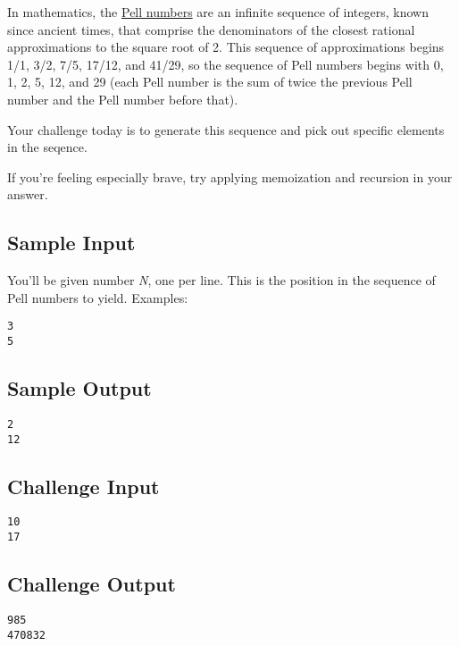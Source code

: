 In mathematics, the
\href{https://en.wikipedia.org/wiki/Pell_number}{Pell numbers} are an
infinite sequence of integers, known since ancient times, that comprise
the denominators of the closest rational approximations to the square
root of 2. This sequence of approximations begins 1/1, 3/2, 7/5, 17/12,
and 41/29, so the sequence of Pell numbers begins with 0, 1, 2, 5, 12,
and 29 (each Pell number is the sum of twice the previous Pell number
and the Pell number before that).

Your challenge today is to generate this sequence and pick out specific
elements in the seqence.

If you're feeling especially brave, try applying memoization and
recursion in your answer.

\subsection{Sample Input}\label{sample-input-2}

You'll be given number \emph{N}, one per line. This is the position in
the sequence of Pell numbers to yield. Examples:

\begin{verbatim}
3
5
\end{verbatim}

\subsection{Sample Output}\label{sample-output-2}

\begin{verbatim}
2
12
\end{verbatim}

\subsection{Challenge Input}\label{challenge-input-28}

\begin{verbatim}
10
17
\end{verbatim}

\subsection{Challenge Output}\label{challenge-output-23}

\begin{verbatim}
985
470832
\end{verbatim}

